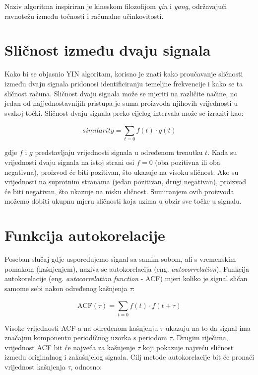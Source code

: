\documentclass[times, utf8, diplomski, numeric]{fer}
\begin{document}
Naziv algoritma inspiriran je kineskom filozofijom \textit{yin} i \textit{yang}, održavajući ravnotežu između točnosti i računalne učinkovitosti.

\section{Sličnost između dvaju signala}
%
Kako bi se objasnio YIN algoritam, korisno je znati kako proučavanje sličnosti između dvaju signala pridonosi identificiranju temeljne frekvencije i kako se ta sličnost računa. Sličnost dvaju signala može se mjeriti na različite načine, no jedan od najjednostavnijih pristupa je suma proizvoda njihovih vrijednosti u svakoj točki. Sličnost dvaju signala preko cijelog intervala može se izraziti kao:

\begin{equation}
	similarity = \sum_{t = 0}^{} {f(t) \cdot g(t)}
\end{equation}

gdje $f$ i $g$ predstavljaju vrijednosti signala u određenom trenutku $t$. Kada su vrijednosti dvaju signala na istoj strani osi $f = 0$ (oba pozitivna ili oba negativna), proizvod će biti pozitivan, što ukazuje na visoku sličnost. Ako su vrijednosti na suprotnim stranama (jedan pozitivan, drugi negativan), proizvod će biti negativan, što ukazuje na nisku sličnost. Sumiranjem ovih proizvoda možemo dobiti ukupnu mjeru sličnosti koja uzima u obzir sve točke u signalu.

\section{Funkcija autokorelacije}
Poseban slučaj gdje uspoređujemo signal sa samim sobom, ali s vremenskim pomakom (kašnjenjem), naziva se autokorelacija (eng. \textit{autocorrelation}). Funkcija autokorelacije (eng. \textit{autocorrelation function} - ACF) mjeri koliko je signal sličan samome sebi nakon određenog kašnjenja $\tau$:

\begin{equation}
	\mathrm{ACF}(\tau) = \sum_{t = 0}^{} {f(t) \cdot f(t + \tau)}
\end{equation}

Visoke vrijednosti ACF-a na određenom kašnjenju $\tau$ ukazuju na to da signal ima značajnu komponentu periodičnog uzorka s periodom $\tau$. Drugim riječima, vrijednost ACF bit će najveća za kašnjenje $\tau$ koji pokazuje najveću sličnost između originalnog i zakašnjelog signala. Cilj metode autokorelacije bit će pronaći vrijednost kašnjenja $\tau$, odnosno:
\end{document}

